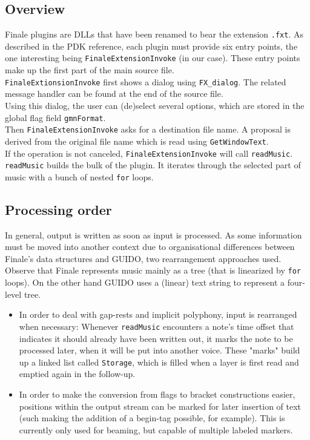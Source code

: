 \documentclass{article}
\begin{document}
\subsection{Overview}
Finale plugins are DLLs that have been renamed to bear the extension \verb".fxt".
As described in the PDK reference, each plugin must provide six entry points,
the one interesting being \verb"FinaleExtensionInvoke" (in our case).
These entry points make up the first part of the main source file.\\
\verb"FinaleExtionsionInvoke" first shows a dialog using \verb"FX_dialog". The
related message handler can be found at the end of the source file.\\
Using this dialog, the user can (de)select several options, which are stored
in the global flag field \verb"gmnFormat".\\
Then \verb"FinaleExtensionInvoke" asks for a destination file name. A proposal is
derived from the original file name which is read using \verb"GetWindowText".\\
If the operation is not canceled, \verb"FinaleExtensionInvoke" will call
\verb"readMusic". \verb"readMusic" builds the bulk of the plugin. It 
iterates through the selected part of music with a bunch of nested \verb"for"
loops.

\subsection{Processing order}
In general, output is written as soon as input is processed. As some
information must be moved into another context due to organisational differences
between Finale's data structures and GUIDO, two rearrangement approaches used.\\
Observe that Finale represents music mainly as a tree (that is linearized by
\verb"for" loops). On the other hand GUIDO uses a (linear) text string to
represent a four-level tree.
\begin{itemize}
\item In order to deal with gap-rests and implicit polyphony, input is rearranged
when necessary:
Whenever \verb"readMusic" encounters a note's time offset that indicates it
should already have been
written out, it marks the note to be processed later, when it will be put into
another voice. These "marks" build up a linked list called \verb"Storage", which
is filled when a layer is first read and emptied again in the follow-up. 
\item In order to make the conversion from flags to bracket constructions easier,
positions within the output stream can be marked for later insertion of text
(such making the addition of a begin-tag possible, for example). This is currently
only used for beaming, but capable of multiple labeled markers.
\end{itemize}
\end{document}
